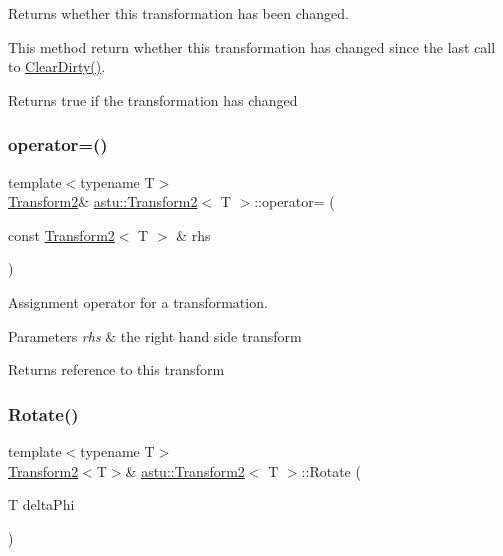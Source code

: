 Returns whether this transformation has been changed.

This method return whether this transformation has changed since the last call to \hyperlink{classastu_1_1Transform2_afbd879828c3b5de8767be64e11fc79ec}{Clear\+Dirty()}.

\begin{DoxyReturn}{Returns}
{\ttfamily true} if the transformation has changed 
\end{DoxyReturn}
\mbox{\label{classastu_1_1Transform2_a486d9255c074d2e96c8302f5e2c1da53}} 
\subsubsection{\texorpdfstring{operator=()}{operator=()}}
{\footnotesize\ttfamily template$<$typename T$>$ \\
\hyperlink{classastu_1_1Transform2}{Transform2}\& \hyperlink{classastu_1_1Transform2}{astu\+::\+Transform2}$<$ T $>$\+::operator= (\begin{DoxyParamCaption}\item[{const \hyperlink{classastu_1_1Transform2}{Transform2}$<$ T $>$ \&}]{rhs }\end{DoxyParamCaption})\hspace{0.3cm}{\ttfamily [inline]}}

Assignment operator for a transformation.


\begin{DoxyParams}{Parameters}
{\em rhs} & the right hand side transform \\
\hline
\end{DoxyParams}
\begin{DoxyReturn}{Returns}
reference to this transform 
\end{DoxyReturn}
\mbox{\label{classastu_1_1Transform2_a03ad8a715f9d9ba348872998bb2b8dbd}} 
\subsubsection{\texorpdfstring{Rotate()}{Rotate()}}
{\footnotesize\ttfamily template$<$typename T$>$ \\
\hyperlink{classastu_1_1Transform2}{Transform2}$<$T$>$\& \hyperlink{classastu_1_1Transform2}{astu\+::\+Transform2}$<$ T $>$\+::Rotate (\begin{DoxyParamCaption}\item[{T}]{delta\+Phi }\end{DoxyParamCaption})\hspace{0.3cm}{\ttfamily [inline]}}

